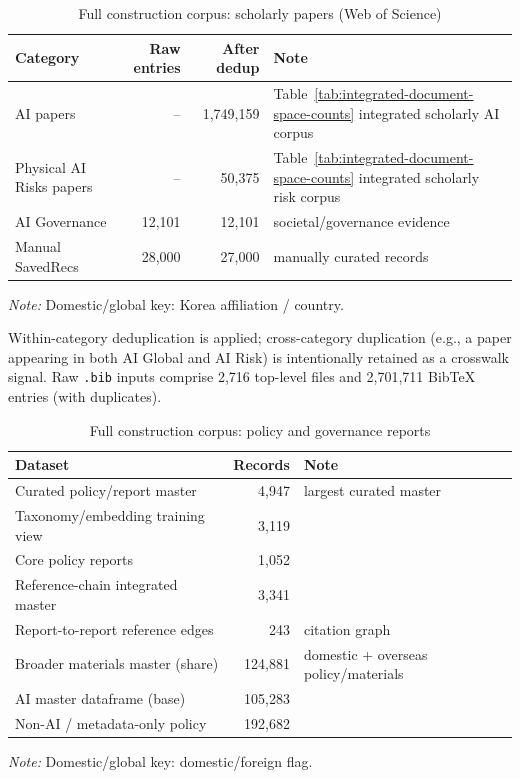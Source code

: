 \documentclass[11pt]{article}
\begin{document}
\begin{table}[htbp]
\centering
\footnotesize
\caption{Full construction corpus: scholarly papers (Web of Science)}
\label{tab:corpus-papers}
\begin{tabularx}{\linewidth}{Xrr l}
\toprule
Category & Raw entries & After dedup & Note \\
\midrule
AI papers & -- & 1,749,159 & Table~\ref{tab:integrated-document-space-counts} integrated scholarly AI corpus \\
Physical AI Risks papers & -- & 50,375 & Table~\ref{tab:integrated-document-space-counts} integrated scholarly risk corpus \\
AI Governance & 12,101 & 12,101 & societal/governance evidence \\
Manual SavedRecs & 28,000 & 27,000 & manually curated records \\
\bottomrule
\end{tabularx}
\par\smallskip\begin{minipage}{0.92\linewidth}
\footnotesize\textit{Note:} Domestic/global key: Korea affiliation / country.
\end{minipage}
\end{table}

Within-category deduplication is applied; cross-category duplication (e.g., a paper appearing in both AI Global and AI Risk) is intentionally retained as a crosswalk signal. Raw \texttt{.bib} inputs comprise 2,716 top-level files and 2,701,711 BibTeX entries (with duplicates).

\begin{table}[htbp]
\centering
\footnotesize
\caption{Full construction corpus: policy and governance reports}
\label{tab:corpus-policy}
\begin{tabularx}{\linewidth}{Xr l}
\toprule
Dataset & Records & Note \\
\midrule
Curated policy/report master & 4,947 & largest curated master \\
Taxonomy/embedding training view & 3,119 & \\
Core policy reports & 1,052 & \\
Reference-chain integrated master & 3,341 & \\
Report-to-report reference edges & 243 & citation graph \\
\midrule
Broader materials master (share) & 124,881 & domestic + overseas policy/materials \\
AI master dataframe (base) & 105,283 & \\
Non-AI / metadata-only policy & 192,682 & \\
\bottomrule
\end{tabularx}
\par\smallskip\begin{minipage}{0.92\linewidth}
\footnotesize\textit{Note:} Domestic/global key: domestic/foreign flag.
\end{minipage}
\end{table}
\end{document}
